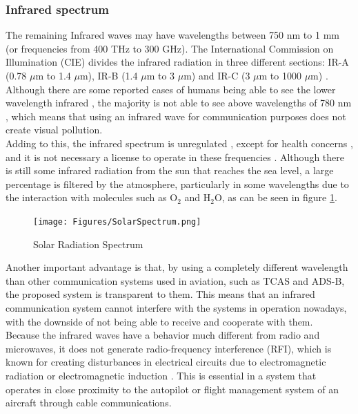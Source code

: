 \subsubsection{Infrared spectrum}
The remaining Infrared waves may have wavelengths between 750 nm to 1 mm (or frequencies from 400 THz to 300 GHz). The International Commission on Illumination (CIE) divides the infrared radiation in three different sections: IR-A (0.78 $\mu$m to 1.4 $\mu$m), IR-B (1.4 $\mu$m to 3 $\mu$m) and IR-C (3 $\mu$m to 1000 $\mu$m) \citep{Taylor2000}. \\
Although there are some reported cases of humans being able to see the lower wavelength infrared \citep{Cox}, the majority is not able to see above wavelengths of 780 nm , which means that using an infrared wave for communication purposes does not create visual pollution.\\
Adding to this, the infrared spectrum is unregulated \citep{Hou2015}, except for health concerns \citep{Ghassemlooy2006}, and it is not necessary a license to operate in these frequencies \citep{Hou2015}. Although there is still some infrared radiation from the sun that reaches the sea level, a large percentage is filtered by the atmosphere, particularly in some wavelengths due to the interaction with molecules such as O$_{2}$ and H$_{2}$O, as can be seen in figure \ref{fig:solarspectrum}.\\
\begin{figure}[!htb]
  \centering
  \texttt{[image: Figures/SolarSpectrum.png]}
  \caption[Solar Radiation Spectrum \citep{Rohde2007}]{Solar Radiation Spectrum \citep{Rohde2007}}
  \label{fig:solarspectrum}
\end{figure}

Another important advantage is that, by using a completely different wavelength than other communication systems used in aviation, such as TCAS and ADS-B, the proposed system is transparent to them. This means that an infrared communication system cannot interfere with the systems in operation nowadays, with the downside of not being able to receive and cooperate with them.\\
Because the infrared waves have a behavior much different from radio and microwaves, it does not generate radio-frequency interference (RFI), which is known for creating disturbances in electrical circuits due to electromagnetic radiation or electromagnetic induction \citep{Hou2015}. This is essential in a system that operates in close proximity to the autopilot or flight management system of an aircraft through cable communications.\\

